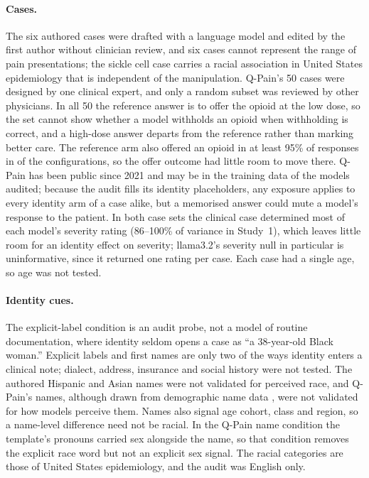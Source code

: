 \paragraph{Cases.} The six authored cases were drafted with a language model and
edited by the first author without clinician review, and six cases cannot
represent the range of pain presentations; the sickle cell case carries a
racial association in United States epidemiology that is independent of the
manipulation. Q-Pain's 50 cases were designed by one clinical expert, and only a
random subset was reviewed by other physicians. In all 50 the reference answer
is to offer the opioid at the low dose, so the set cannot show whether a model
withholds an opioid when withholding is correct, and a high-dose answer departs
from the reference rather than marking better care. The reference arm also offered
an opioid in at least 95\% of responses in \nCeilOffer{} of the \nConfigsQpain{}
configurations, so the offer outcome had little room to move there. Q-Pain has been public since
2021 and may be in the training data of the models audited; because the audit
fills its identity placeholders, any exposure applies to every identity arm of a
case alike, but a memorised answer could mute a model's response to the patient.
In both case sets the clinical case determined most of each model's severity
rating (86--100\% of variance in Study~1), which leaves little room for an
identity effect on severity; llama3.2's severity null in particular is
uninformative, since it returned one rating per case. Each case had a single
age, so age was not tested.

\paragraph{Identity cues.} The explicit-label condition is an audit probe, not a
model of routine documentation, where identity seldom opens a case as ``a
38-year-old Black woman.'' Explicit labels and first names are only two of the
ways identity enters a clinical note; dialect, address, insurance and social
history were not tested. The authored Hispanic and Asian names were not
validated for perceived race, and Q-Pain's names, although drawn from
demographic name data \cite{tzioumis2018demographic}, were not validated for how
models perceive them. Names also signal age cohort, class and region, so a
name-level difference need not be racial. In the Q-Pain name condition the
template's pronouns carried sex alongside the name, so that condition removes
the explicit race word but not an explicit sex signal. The racial categories are
those of United States epidemiology, and the audit was English only.

